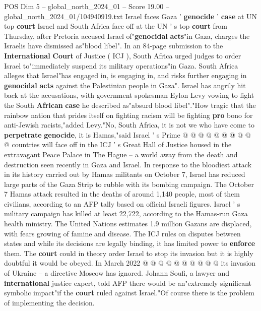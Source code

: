 \begin{textsample}{POS Dim 5 – global\_north\_2024\_01 – Score 19.00 – global\_north\_2024\_01/104940919.txt}  \label{ex:f5_pos_135}
Israel faces Gaza ' \textbf{genocide} ' \textbf{case} at UN top \textbf{court} Israel and South Africa face off at the UN ' s top \textbf{court} from Thursday, after Pretoria accused Israel of"\textbf{genocidal} \textbf{acts}"in Gaza, charges the Israelis have dismissed as"blood libel".
In an 84-page submission to the \textbf{International} \textbf{Court} of Justice ( ICJ ), South Africa urged judges to order Israel to"immediately suspend its military operations"in Gaza.
South Africa alleges that Israel"has engaged in, is engaging in, and risks further engaging in \textbf{genocidal} \textbf{acts} against the Palestinian people in Gaza".
Israel has angrily hit back at the accusations, with government spokesman Eylon Levy vowing to fight the South \textbf{African} \textbf{case} he described as"absurd blood libel"."How tragic that the rainbow nation that prides itself on fighting racism will be fighting \textbf{pro} bono for anti-Jewish racists,"added Levy."No, South Africa, it is not we who have come to \textbf{perpetrate} \textbf{genocide}, it is Hamas,"said Israel ' s Prime @ @ @ @ @ @ @ @ @ @ countries will face off in the ICJ ' s Great Hall of Justice housed in the extravagant Peace Palace in The Hague -- a world away from the death and destruction seen recently in Gaza and Israel.
In response to the bloodiest attack in its history carried out by Hamas militants on October 7, Israel has reduced large parts of the Gaza Strip to rubble with its bombing campaign.
The October 7 Hamas attack resulted in the deaths of around 1,140 people, most of them civilians, according to an AFP tally based on official Israeli figures.
Israel ' s military campaign has killed at least 22,722, according to the Hamas-run Gaza health ministry.
The United Nations estimates 1.9 million Gazans are displaced, with fears growing of famine and disease.
The ICJ rules on disputes between states and while its decisions are legally binding, it has limited power to \textbf{enforce} them.
The \textbf{court} could in theory order Israel to stop its invasion but it is highly doubtful it would be obeyed.
In March 2022 @ @ @ @ @ @ @ @ @ @ its invasion of Ukraine -- a directive Moscow has ignored.
Johann Soufi, a lawyer and \textbf{international} justice expert, told AFP there would be an"extremely significant symbolic impact"if the \textbf{court} ruled against Israel."Of course there is the problem of implementing the decision.

\end{textsample}
